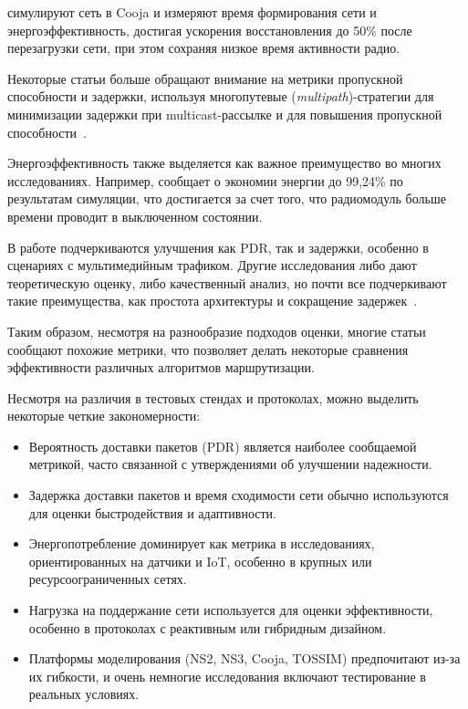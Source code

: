 \documentclass[%
]{report}
\begin{document}
\textcite{HECK2025110364} симулируют сеть в
Cooja и измеряют время формирования сети
и энергоэффективность, достигая ускорения восстановления
до 50\% после
перезагрузки сети,
при этом сохраняя низкое время активности радио.

Некоторые статьи больше обращают внимание на метрики
пропускной способности и задержки,
используя многопутевые (\emph{multipath})-стратегии для минимизации
задержки при multicast-рассылке и для повышения
пропускной способности~\cite{KUMAR2012481,LI2011458}.

Энергоэффективность также выделяется как важное
преимущество во многих исследованиях. Например,
\textcite{HERNANDEZSOLANA2022109114} сообщает
о экономии энергии до 99,24\% по результатам
симуляции, что достигается за счет
того, что радиомодуль больше времени проводит в выключенном состоянии.

В работе \textcite{PAN2012952} подчеркиваются
улучшения как PDR, так и задержки,
особенно в сценариях с мультимедийным трафиком.
Другие исследования либо дают теоретическую оценку,
либо качественный анализ,
но почти все подчеркивают такие преимущества,
как простота архитектуры и сокращение задержек~\cite{ALVAREZ2008240,DIIANNI1998131}.

Таким образом, несмотря на разнообразие подходов
оценки, многие статьи сообщают похожие метрики,
что позволяет делать некоторые сравнения
эффективности различных алгоритмов
маршрутизации.

Несмотря на различия в тестовых стендах и протоколах, можно выделить некоторые четкие закономерности:

\begin{itemize}
\item    Вероятность доставки пакетов (PDR)
является наиболее сообщаемой метрикой,
часто связанной с утверждениями об улучшении надежности.
\item  Задержка доставки пакетов
и время сходимости сети обычно
используются для оценки быстродействия и адаптивности.
\item    Энергопотребление доминирует
как метрика в исследованиях,
ориентированных на датчики и IoT,
особенно в крупных или ресурсоограниченных сетях.
\item    Нагрузка на поддержание сети
используется для оценки эффективности, особенно в протоколах
с реактивным или гибридным дизайном.
\item    Платформы моделирования
(NS2, NS3, Cooja, TOSSIM) предпочитают из-за их
гибкости, и очень немногие исследования включают
тестирование в реальных условиях.
\end{itemize}
\end{document}
